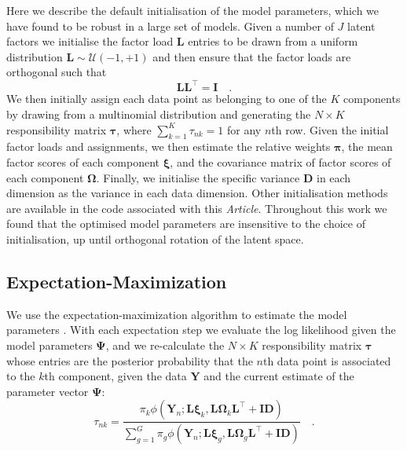 \documentclass[twocolumn]{aastex62}
\newcommand{\vect}[1]{\boldsymbol{\mathbf{#1}}}
\renewcommand{\vec}[1]{\vect{#1}}
\newcommand{\weight}{\pi}
\newcommand{\data}{\textbf{Y}}
\newcommand{\vecdata}{\vec\data}
\newcommand{\transpose}{^\intercal}
\newcommand{\eye}{\textbf{I}}
\newcommand{\factorloads}{\textbf{L}}
\newcommand{\specificvariance}{\vec{D}}
\newcommand{\scoremeans}{\vec\xi}
\newcommand{\scorecovs}{\vec\Omega}
\newcommand{\NumData}{N}
\newcommand{\numdata}{n}
\newcommand{\NumLatentFactors}{J}
\newcommand{\NumComponents}{K}
\newcommand{\numcomponents}{k}
\begin{document}
Here we describe the default initialisation of the model parameters, which
we have found to be robust in a large set of models. Given a number of
$\NumLatentFactors$ latent factors we initialise the factor load
$\factorloads$ entries to be drawn from a uniform distribution
$\factorloads \sim \mathcal{U}\left(-1, +1\right)$ and then ensure that
the factor loads are orthogonal such that
\begin{equation}
	\factorloads \factorloads\transpose = \eye \quad .
\end{equation}
We then initially assign each data point as belonging to one of the
$\NumComponents$ components by drawing from a multinomial distribution
and generating the $\NumData \times \NumComponents$ responsibility matrix $\vec\tau$,
where $\sum_{k=1}^{K} \tau_{nk} = 1$ for any $n$th row. Given the initial
factor loads and assignments, we then estimate the relative weights
$\vec\pi$, the mean factor scores of each component $\scoremeans$, and
the covariance matrix of factor scores of each component $\scorecovs$.
Finally, we initialise the specific variance $\specificvariance$ in each
dimension as the variance in each data dimension. Other initialisation 
methods are available in the code associated with this \emph{Article}. 
Throughout this work we found that the optimised model parameters are 
insensitive to the choice of initialisation, up until orthogonal 
rotation of the latent space.


\subsection{Expectation-Maximization}

We use the expectation-maximization algorithm to estimate the model parameters
\citep{Dempster:1977}. With each expectation step we evaluate the log likelihood 
given the model parameters $\vec\Psi$, and we re-calculate the $\NumData \times \NumComponents$ responsibility 
matrix $\vec\tau$ whose entries are the posterior probability that the 
$\numdata$th data point is associated to the $\numcomponents$th component, given 
the data $\vecdata$ and the current estimate of the parameter vector $\vec\Psi$:
\begin{equation}
	\tau_{\numdata\numcomponents} = \frac{\weight_\numcomponents\phi(\vecdata_\numdata;\factorloads\scoremeans_\numcomponents, \factorloads\scorecovs_\numcomponents\factorloads\transpose + \eye\specificvariance)}{\sum_{g=1}^{G}\weight_g\phi(\vecdata_\numdata;\factorloads\scoremeans_g, \factorloads\scorecovs_g\factorloads\transpose + \eye\specificvariance)} \quad .
\end{equation}
\end{document}
